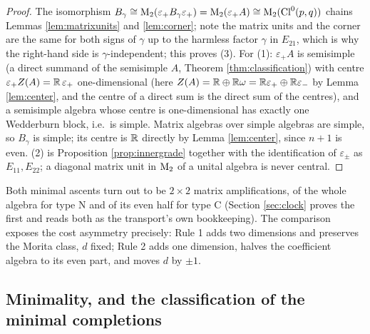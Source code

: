 \begin{proof}
The isomorphism $B_\gamma \cong \mathrm{M}_2(\varepsilon_+ B_\gamma \varepsilon_+) = \mathrm{M}_2(\varepsilon_+ A) \cong \mathrm{M}_2(\mathrm{Cl}^0(p,q))$ chains Lemmas \ref{lem:matrixunits} and \ref{lem:corner}; note the matrix units and the corner are the same for both signs of $\gamma$ up to the harmless factor $\gamma$ in $E_{21}$, which is why the right-hand side is $\gamma$-independent; this proves (3). For (1): $\varepsilon_+ A$ is semisimple (a direct summand of the semisimple $A$, Theorem \ref{thm:classification}) with centre $\varepsilon_+ Z(A) = \mathbb{R}\,\varepsilon_+$ one-dimensional (here $Z(A) = \mathbb{R} \oplus \mathbb{R}\omega = \mathbb{R}\varepsilon_+ \oplus \mathbb{R}\varepsilon_-$ by Lemma \ref{lem:center}, and the centre of a direct sum is the direct sum of the centres), and a semisimple algebra whose centre is one-dimensional has exactly one Wedderburn block, i.e.\ is simple. Matrix algebras over simple algebras are simple, so $B_\gamma$ is simple; its centre is $\mathbb{R}$ directly by Lemma \ref{lem:center}, since $n + 1$ is even. (2) is Proposition \ref{prop:innergrade} together with the identification of $\varepsilon_\pm$ as $E_{11}, E_{22}$; a diagonal matrix unit in $\mathrm{M}_2$ of a unital algebra is never central.
\end{proof}

\begin{remark}\label{rem:M2pattern}
Both minimal ascents turn out to be $2 \times 2$ matrix amplifications, of the whole algebra for type N and of its even half for type C (Section \ref{sec:clock} proves the first and reads both as the transport's own bookkeeping). The comparison exposes the cost asymmetry precisely: Rule 1 adds two dimensions and preserves the Morita class, $d$ fixed; Rule 2 adds one dimension, halves the coefficient algebra to its even part, and moves $d$ by $\pm 1$.
\end{remark}

\subsection{Minimality, and the classification of the minimal completions}\label{subsec:rule2min}

